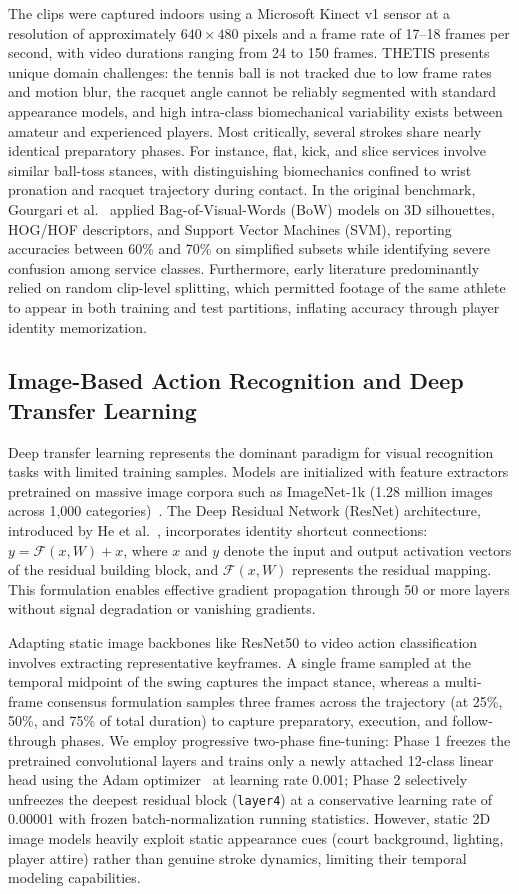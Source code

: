 \documentclass[12pt,a4paper]{article}
\begin{document}
The clips were captured indoors using a Microsoft Kinect v1 sensor at a resolution of approximately $640 \times 480$ pixels and a frame rate of 17--18 frames per second, with video durations ranging from 24 to 150 frames. THETIS presents unique domain challenges: the tennis ball is not tracked due to low frame rates and motion blur, the racquet angle cannot be reliably segmented with standard appearance models, and high intra-class biomechanical variability exists between amateur and experienced players. Most critically, several strokes share nearly identical preparatory phases. For instance, flat, kick, and slice services involve similar ball-toss stances, with distinguishing biomechanics confined to wrist pronation and racquet trajectory during contact. In the original benchmark, Gourgari et al.~\cite{gourgari2013thetis} applied Bag-of-Visual-Words (BoW) models on 3D silhouettes, HOG/HOF descriptors, and Support Vector Machines (SVM), reporting accuracies between 60\% and 70\% on simplified subsets while identifying severe confusion among service classes. Furthermore, early literature predominantly relied on random clip-level splitting, which permitted footage of the same athlete to appear in both training and test partitions, inflating accuracy through player identity memorization.
\clearpage
\subsection{Image-Based Action Recognition and Deep Transfer Learning}
Deep transfer learning represents the dominant paradigm for visual recognition tasks with limited training samples. Models are initialized with feature extractors pretrained on massive image corpora such as ImageNet-1k (1.28 million images across 1,000 categories)~\cite{russakovsky2015imagenet}. The Deep Residual Network (ResNet) architecture, introduced by He et al.~\cite{he2016deep}, incorporates identity shortcut connections: $y = \mathcal{F}(x, W) + x$, where $x$ and $y$ denote the input and output activation vectors of the residual building block, and $\mathcal{F}(x, W)$ represents the residual mapping. This formulation enables effective gradient propagation through 50 or more layers without signal degradation or vanishing gradients.

Adapting static image backbones like ResNet50 to video action classification involves extracting representative keyframes. A single frame sampled at the temporal midpoint of the swing captures the impact stance, whereas a multi-frame consensus formulation samples three frames across the trajectory (at 25\%, 50\%, and 75\% of total duration) to capture preparatory, execution, and follow-through phases. We employ progressive two-phase fine-tuning: Phase 1 freezes the pretrained convolutional layers and trains only a newly attached 12-class linear head using the Adam optimizer~\cite{kingma2015adam} at learning rate 0.001; Phase 2 selectively unfreezes the deepest residual block (\texttt{layer4}) at a conservative learning rate of 0.00001 with frozen batch-normalization running statistics. However, static 2D image models heavily exploit static appearance cues (court background, lighting, player attire) rather than genuine stroke dynamics, limiting their temporal modeling capabilities.
\end{document}
